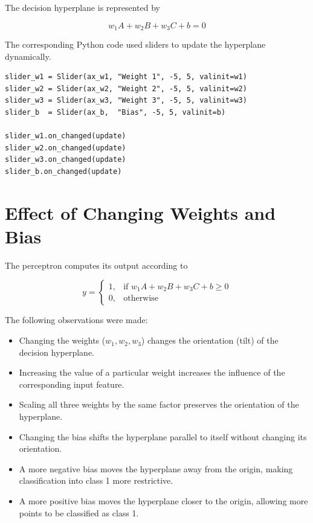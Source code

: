 \documentclass[12pt]{article}
\begin{document}
The decision hyperplane is represented by

\[
    w_1A+w_2B+w_3C+b=0
\]

The corresponding Python code used sliders to update the hyperplane dynamically.

\begin{lstlisting}[caption=Interactive Sliders]
slider_w1 = Slider(ax_w1, "Weight 1", -5, 5, valinit=w1)
slider_w2 = Slider(ax_w2, "Weight 2", -5, 5, valinit=w2)
slider_w3 = Slider(ax_w3, "Weight 3", -5, 5, valinit=w3)
slider_b  = Slider(ax_b,  "Bias", -5, 5, valinit=b)

slider_w1.on_changed(update)
slider_w2.on_changed(update)
slider_w3.on_changed(update)
slider_b.on_changed(update)
\end{lstlisting}

\section{Effect of Changing Weights and Bias}

The perceptron computes its output according to

\[
    y=
    \begin{cases}
        1, & \text{if }w_1A+w_2B+w_3C+b\ge0 \\
        0, & \text{otherwise}
    \end{cases}
\]

The following observations were made:

\begin{itemize}
    \item Changing the weights ($w_1,w_2,w_3$) changes the orientation (tilt) of the decision hyperplane.
    \item Increasing the value of a particular weight increases the influence of the corresponding input feature.
    \item Scaling all three weights by the same factor preserves the orientation of the hyperplane.
    \item Changing the bias shifts the hyperplane parallel to itself without changing its orientation.
    \item A more negative bias moves the hyperplane away from the origin, making classification into class 1 more restrictive.
    \item A more positive bias moves the hyperplane closer to the origin, allowing more points to be classified as class 1.
\end{itemize}
\end{document}
